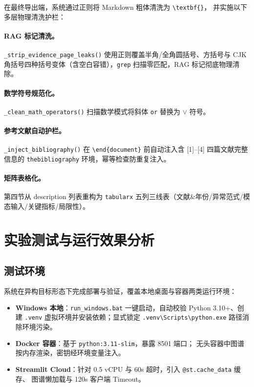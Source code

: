 \documentclass[a4paper,11pt]{article}
\begin{document}
在最终导出端，系统通过正则将 Markdown 粗体清洗为 \texttt{\textbackslash textbf\{\}}，
并实施以下多层物理清洗护栏：

\paragraph{RAG 标记清洗。}
\texttt{\_strip\_evidence\_page\_leaks()} 使用正则覆盖半角/全角圆括号、方括号与
CJK 角括号四种括号变体（含空白容错），\texttt{grep} 扫描零匹配，RAG 标记彻底物理清除。

\paragraph{数学符号规范化。}
\texttt{\_clean\_math\_operators()} 扫描数学模式将斜体 \texttt{or} 替换为 $\lor$ 符号。

\paragraph{参考文献自动护栏。}
\texttt{\_inject\_bibliography()} 在 \texttt{\textbackslash end\{document\}} 前自动注入含 [1]--[4] 四篇文献完整信息的
\texttt{thebibliography} 环境，幂等检查防重复注入。

\paragraph{矩阵表格化。}
第四节从 description 列表重构为 \texttt{tabularx} 五列三线表（文献\&年份/异常范式/模态输入/关键指标/局限性）。

\section{实验测试与运行效果分析}

\subsection{测试环境}
系统在异构目标形态下完成部署与验证，覆盖本地桌面与容器两类运行环境：
\begin{itemize}
  \item \textbf{Windows 本地}：\texttt{run\_windows.bat} 一键启动，自动校验 Python 3.10+、创建
        \texttt{.venv} 虚拟环境并安装依赖；显式锁定 \texttt{.venv\textbackslash Scripts\textbackslash python.exe} 路径消除环境污染。
  \item \textbf{Docker 容器}：基于 \texttt{python:3.11-slim}，暴露 8501 端口；
        无头容器中图谱按内存渲染，密钥经环境变量注入。
  \item \textbf{Streamlit Cloud}：针对 0.5 vCPU 与 60s 超时，引入 \texttt{@st.cache\_data} 缓存、
        图谱懒加载与 120s 客户端 Timeout。
\end{itemize}
\end{document}
